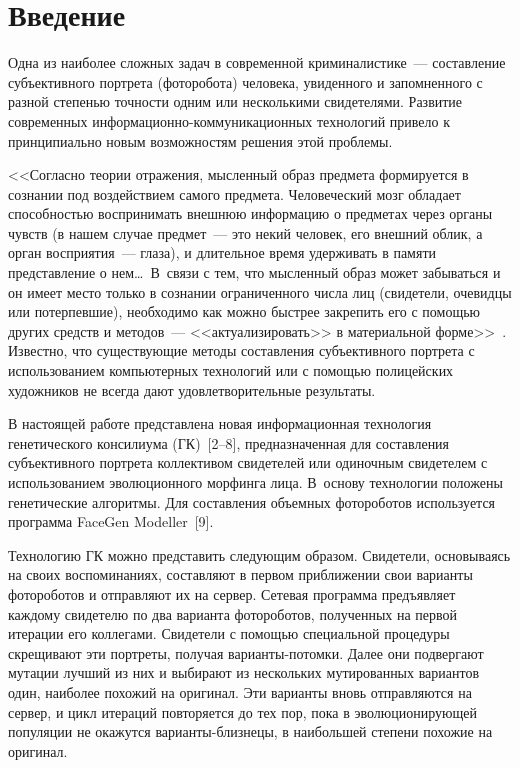       \begin{multicols}{2}

      \label{st\stat}
     
\section{Введение}
     
     Одна из наиболее сложных задач в современной криминалистике~--- 
составление субъективного портрета (фоторобота) человека, увиденного и 
запомненного с разной степенью точности одним или несколькими 
свидетелями. Развитие современных информационно-коммуникационных 
технологий привело к принципиально новым возможностям решения этой 
проблемы. 
     
     <<Согласно теории отражения, мысленный образ предмета формируется 
в сознании под воздействием самого предмета. Человеческий мозг обладает 
способностью воспринимать внешнюю информацию о предметах через органы 
чувств (в нашем случае предмет~--- это некий человек, его внешний облик, а 
орган восприятия~--- глаза), и длительное время удерживать в памяти 
представление о нем\ldots\ В~связи с тем, что мысленный образ может 
забываться и он имеет место только в сознании ограниченного числа лиц 
(свидетели, очевидцы или потерпевшие), необходимо как можно быст\-рее 
закрепить его с помощью других средств и методов~--- <<актуализировать>> в 
материальной форме>>~\cite{1pr}. Известно, что существующие методы 
со\-став\-ле\-ния субъективного портрета с использованием компьютерных 
технологий или с помощью полицейских художников не всегда дают 
удовлетворительные результаты. 
     
     В настоящей работе представлена новая информационная технология 
генетического консилиума (ГК)~[2--8], предназначенная для составления 
субъективного портрета коллективом свидетелей или одиночным свидетелем с 
использованием эволюционного морфинга лица. В~основу технологии 
положены генетические алгоритмы. Для составления объемных фотороботов 
используется программа FaceGen Modeller~[9]. 
     
     Технологию ГК можно представить следующим образом. Свидетели, 
основываясь на своих воспоминаниях, составляют в первом приближении свои 
варианты фотороботов и отправляют их на сервер. Сетевая программа 
предъявляет каждому свидетелю по два варианта фотороботов, полученных на 
первой итерации его коллегами. Свидетели с помощью специальной процедуры 
скрещивают эти портреты, получая варианты-потомки. Далее они подвергают 
мутации лучший из них и выбирают из нескольких мутированных вариантов 
один, наиболее похожий на оригинал. Эти варианты вновь отправляются на 
сервер, и цикл итераций повторяется до тех пор, пока в эво\-лю\-цио\-ни\-ру\-ющей 
популяции не окажутся варианты-близнецы, в наибольшей степени похожие на 
оригинал. 
     

\end{multicols}
